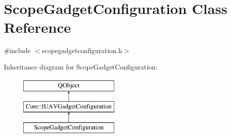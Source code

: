 \hypertarget{class_scope_gadget_configuration}{\section{Scope\-Gadget\-Configuration Class Reference}
\label{class_scope_gadget_configuration}
}


{\ttfamily \#include $<$scopegadgetconfiguration.\-h$>$}

Inheritance diagram for Scope\-Gadget\-Configuration\-:\begin{figure}[H]
\begin{center}
\leavevmode
\includegraphics[height=3.000000cm]{class_scope_gadget_configuration}
\end{center}
\end{figure}
